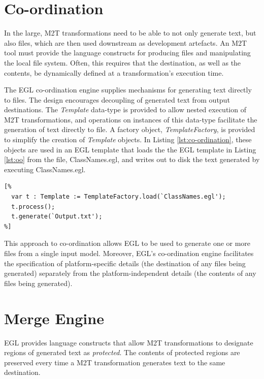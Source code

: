 \section{Co-ordination}
\label{Co-ordination}
In the large, M2T transformations need to be able to not only generate
text, but also files, which are then used downstream as development
artefacts.  An M2T tool must provide the language constructs for
producing files and manipulating the local file system.  Often, this
requires that the destination, as well as the contents, be dynamically
defined at a transformation's execution time.

The EGL co-ordination engine supplies mechanisms for generating text
directly to files.  The design encourages decoupling of generated text
from output destinations. The \emph{Template} data-type is provided to
allow nested execution of M2T transformations, and operations on
instances of this data-type facilitate the generation of text directly
to file. A factory object, \emph{TemplateFactory}, is provided to
simplify the creation of \emph{Template} objects.  In Listing
\ref{lst:co-ordination}, these objects are used in an EGL template
that loads the the EGL template in Listing \ref{lst:oo} from the file,
ClassNames.egl, and writes out to disk the text generated by executing
ClassNames.egl.

\begin{lstlisting}[basicstyle=\ttfamily\footnotesize, tabsize=2, flexiblecolumns=true, caption=Storing the name of each Class to disk., label=lst:co-ordination]
[%
  var t : Template := TemplateFactory.load(`ClassNames.egl');
  t.process();
  t.generate(`Output.txt');
%]
\end{lstlisting}

This approach to co-ordination allows EGL to be used to generate one
or more files from a single input model. Moreover, EGL's co-ordination
engine facilitates the specification of platform-specific details (the
destination of any files being generated) separately from the
platform-independent details (the contents of any files being
generated).

\section{Merge Engine}
EGL provides language constructs that allow M2T transformations to
designate regions of generated text as \textit{protected}. The
contents of protected regions are preserved every time a M2T
transformation generates text to the same destination.

